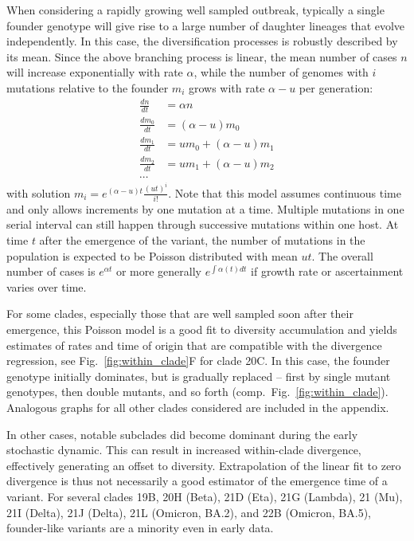 \documentclass[aps,rmp, twocolumn]{revtex4}
\begin{document}
When considering a rapidly growing well sampled outbreak, typically a single founder genotype will give rise to a large number of daughter lineages that evolve independently.
In this case, the diversification processes is robustly described by its mean.
Since the above branching process is linear, the mean number of cases $n$ will increase exponentially with rate $\alpha$, while the number of genomes with $i$ mutations relative to the founder $m_i$ grows with rate $\alpha - u$ per generation:
\begin{equation}
    \begin{split}
        \frac{dn}{dt} &= \alpha n \\
        \frac{dm_0}{dt} &= (\alpha - u) m_0 \\
        \frac{dm_1}{dt} &= u m_0 + (\alpha - u) m_1 \\
        \frac{dm_2}{dt} &= u m_1 + (\alpha - u) m_2 \\
        \cdots
    \end{split}
\end{equation}
with solution $m_i = e^{(\alpha - u)t} \frac{(ut)^i}{i!}$.
Note that this model assumes continuous time and only allows increments by one mutation at a time.
Multiple mutations in one serial interval can still happen through successive mutations within one host.
At time $t$ after the emergence of the variant, the number of mutations in the population is expected to be Poisson distributed with mean $ut$.
The overall number of cases is $e^{\alpha t}$ or more generally $e^{\int \alpha(t) dt}$ if growth rate or ascertainment varies over time.

For some clades, especially those that are well sampled soon after their emergence, this Poisson model is a good fit to diversity accumulation and yields estimates of rates and time of origin that are compatible with the divergence regression, see Fig.~\ref{fig:within_clade}F for clade 20C.
In this case, the founder genotype initially dominates, but is gradually replaced -- first by single mutant genotypes, then double mutants, and so forth (comp.~Fig.~\ref{fig:within_clade}).
Analogous graphs for all other clades considered are included in the appendix.

In other cases, notable subclades did become dominant during the early stochastic dynamic.
This can result in increased within-clade divergence, effectively generating an offset to diversity.
Extrapolation of the linear fit to zero divergence is thus not necessarily a good estimator of the emergence time of a variant.
For several clades 19B, 20H (Beta), 21D (Eta), 21G (Lambda), 21 (Mu), 21I (Delta), 21J (Delta), 21L (Omicron, BA.2), and 22B (Omicron, BA.5), founder-like variants are a minority even in early data.
\end{document}
